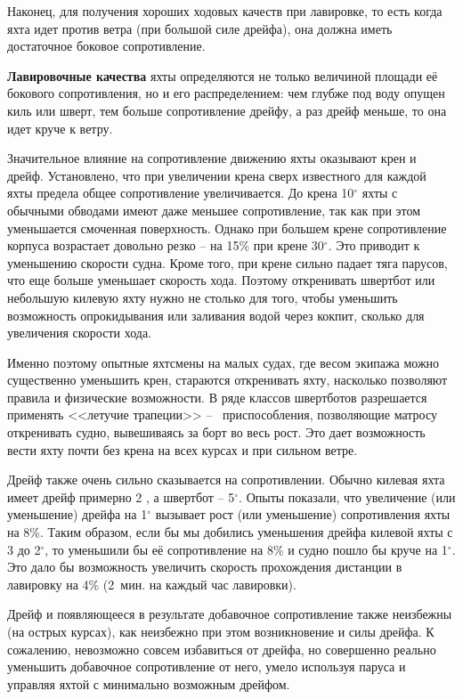 \documentclass[a4paper, 12pt, twoside, final]{scrbook}
\begin{document}
Наконец, для получения хороших ходовых качеств при лавировке, то есть когда яхта идет против ветра (при большой силе дрейфа), она должна иметь достаточное боковое сопротивление.

\textbf{Лавировочные качества} яхты определяются не только величиной площади её бокового сопротивления, но и его распределением: чем глубже под воду опущен киль или шверт, тем больше сопротивление дрейфу, а раз дрейф меньше, то она идет круче к ветру.

Значительное влияние на сопротивление движению яхты оказывают крен и дрейф. Установлено, что при увеличении крена сверх известного для каждой яхты предела общее сопротивление увеличивается. До крена 10$^\circ$ яхты с обычными обводами имеют даже меньшее сопротивление, так как при этом уменьшается смоченная поверхность. Однако при большем крене сопротивление корпуса возрастает довольно резко \--- на 15\% при крене 30$^\circ$. Это приводит к уменьшению скорости судна. Кроме того, при крене сильно падает тяга парусов, что еще больше уменьшает скорость хода. Поэтому откренивать швертбот или небольшую килевую яхту нужно не столько для того, чтобы уменьшить возможность опрокидывания или заливания водой через кокпит, сколько для увеличения скорости хода.

Именно поэтому опытные яхтсмены на малых судах, где весом экипажа можно существенно уменьшить крен, стараются откренивать яхту, насколько позволяют правила и физические возможности. В ряде классов швертботов разрешается применять <<летучие трапеции>> \---~ приспособления, позволяющие матросу откренивать судно, вывешиваясь за борт во весь рост. Это дает возможность вести яхту почти без крена на всех курсах и при сильном ветре.

Дрейф также очень сильно сказывается на сопротивлении. Обычно килевая яхта имеет дрейф примерно 2 , а швертбот \--- 5$^\circ$. Опыты показали, что увеличение (или уменьшение) дрейфа на 1$^\circ$ вызывает рост (или уменьшение) сопротивления яхты на 8\%. Таким образом, если бы мы добились уменьшения дрейфа килевой яхты с 3 до 2$^\circ$, то уменьшили бы её сопротивление на 8\% и судно пошло бы круче на 1$^\circ$. Это дало бы возможность увеличить скорость прохождения дистанции в лавировку на 4\% (2~мин. на каждый час лавировки).

Дрейф и появляющееся в результате добавочное сопротивление также неизбежны (на острых курсах), как неизбежно при этом возникновение и силы дрейфа. К сожалению, невозможно совсем избавиться от дрейфа, но совершенно реально уменьшить добавочное сопротивление от него, умело используя паруса и управляя яхтой с минимально возможным дрейфом.
\end{document}
